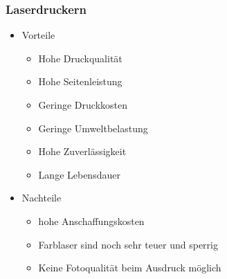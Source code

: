 \documentclass[a4paper]{article}
\begin{document}
    \subsubsection{\color{codegreen}Laserdruckern}
    \begin{itemize}
        \color{red}
        \item Vorteile
        \begin{itemize}
            \color{blue}
            \item Hohe Druckqualität
            \item Hohe Seitenleistung
            \item Geringe Druckkosten
            \item Geringe Umweltbelastung
            \item Hohe Zuverlässigkeit
            \item Lange Lebensdauer
        \end{itemize}
        \item Nachteile
        \begin{itemize}
            \color{blue}
            \item hohe Anschaffungskosten
            \item Farblaser sind noch sehr teuer und sperrig
            \item Keine Fotoqualität beim Ausdruck möglich
        \end{itemize}
    \end{itemize}
\end{document}
